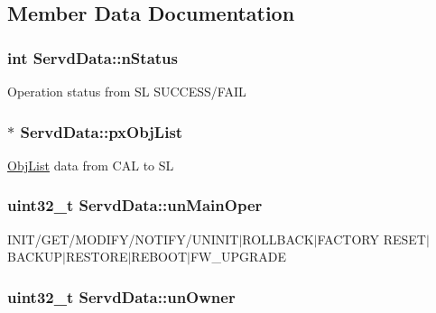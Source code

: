 \subsection{Member Data Documentation}
\hypertarget{structServdData_a0de42c741a9493a88dc7e12b80607c83}{
\subsubsection[{n\-Status}]{\setlength{\rightskip}{0pt plus 5cm}int Servd\-Data\-::n\-Status}}\label{structServdData_a0de42c741a9493a88dc7e12b80607c83}
Operation status from S\-L S\-U\-C\-C\-E\-S\-S/\-F\-A\-I\-L \hypertarget{structServdData_ac66a4b645c210b527cd3f940a5b81397}{
\subsubsection[{px\-Obj\-List}]{$\ast$ Servd\-Data\-::px\-Obj\-List}}\label{structServdData_ac66a4b645c210b527cd3f940a5b81397}
\hyperlink{structObjList}{Obj\-List} data from C\-A\-L to S\-L \hypertarget{structServdData_aee9c93a802703e621f33bd4e065716bb}{
\subsubsection[{un\-Main\-Oper}]{\setlength{\rightskip}{0pt plus 5cm}uint32\-\_\-t Servd\-Data\-::un\-Main\-Oper}}\label{structServdData_aee9c93a802703e621f33bd4e065716bb}
I\-N\-I\-T/\-G\-E\-T/\-M\-O\-D\-I\-F\-Y/\-N\-O\-T\-I\-F\-Y/\-U\-N\-I\-N\-I\-T$\vert$\-R\-O\-L\-L\-B\-A\-C\-K$\vert$\-F\-A\-C\-T\-O\-R\-Y R\-E\-S\-E\-T$\vert$\-B\-A\-C\-K\-U\-P$\vert$\-R\-E\-S\-T\-O\-R\-E$\vert$\-R\-E\-B\-O\-O\-T$\vert$\-F\-W\-\_\-\-U\-P\-G\-R\-A\-D\-E \hypertarget{structServdData_adc9da01914ccc12e73810e813a5a48e2}{
\subsubsection[{un\-Owner}]{\setlength{\rightskip}{0pt plus 5cm}uint32\-\_\-t Servd\-Data\-::un\-Owner}}\label{structServdData_adc9da01914ccc12e73810e813a5a48e2}
